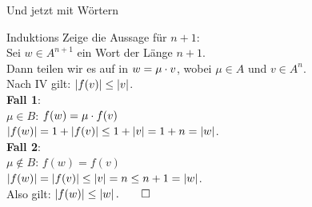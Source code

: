 \begin{frame}{Und jetzt mit Wörtern}
	\begin{block}{Induktions}
		Zeige die Aussage für $n+1$:\\
		Sei $w \in A^{n+1}$ ein Wort der Länge $n+1$.\\
		\pause
		Dann teilen wir es auf in $w = \mu \cdot v$, wobei $\mu \in A$ und $v \in A^n$.\\
		Nach IV gilt: $\left\lvert f(v) \right\rvert \le \left\lvert v \right\rvert$.\\
		\pause
		\smallskip
		\textbf{Fall 1}: \\
			\quad $\mu \in B$: $f(w) = \mu \cdot f(v)$ \\
			\quad \impl $\left\lvert f(w) \right\rvert = 1 + \left\lvert f(v) \right\rvert \le 1 + \left\lvert v \right\rvert = 1+n = \left\lvert w \right\rvert$.\\
		\pause
		\smallskip
		\textbf{Fall 2}: \\
			\quad $\mu \notin B$: $f(w) = f(v)$ \\
			\quad \impl $\left\lvert f(w) \right\rvert = \left\lvert f(v) \right\rvert \le \left\lvert v \right\rvert = n \le n+1 = \left\lvert w \right\rvert$.\\
		\pause
		\smallskip
		Also gilt: $\left\lvert f(w) \right\rvert \le \left\lvert w \right\rvert. \qed$
	\end{block}
\end{frame}